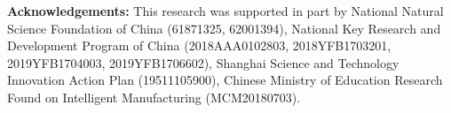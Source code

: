\documentclass[10pt,twocolumn,letterpaper]{article}
\begin{document}
\noindent\textbf{Acknowledgements:}\; This research was supported in part by National Natural Science Foundation of China (61871325, 62001394), National Key Research and Development Program of China (2018AAA0102803, 2018YFB1703201, 2019YFB1704003, 2019YFB1706602), Shanghai Science and Technology Innovation Action Plan (19511105900), Chinese Ministry of Education Research Found on Intelligent Manufacturing (MCM20180703).

{\small


}
\end{document}
